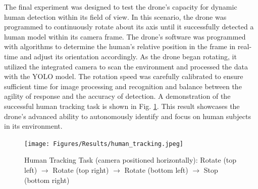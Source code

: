 The final experiment was designed to test the drone's capacity for dynamic human detection within its field of view. In this scenario, the drone was programmed to continuously rotate about its axis until it successfully detected a human model within its camera frame. The drone's software was programmed with algorithms to determine the human's relative position in the frame in real-time and adjust its orientation accordingly. As the drone began rotating, it utilized the integrated camera to scan the environment and processed the data with the YOLO model. The rotation speed was carefully calibrated to ensure sufficient time for image processing and recognition and balance between the agility of response and the accuracy of detection. A demonstration of the successful human tracking task is shown in Fig. \ref{fig3d3}. This result showcases the drone's advanced ability to autonomously identify and focus on human subjects in its environment.

\begin{figure}[H]
    \centerline{\texttt{[image: Figures/Results/human\_tracking.jpeg]}}
    \caption{Human Tracking Task (camera positioned horizontally): Rotate (top left) $\rightarrow$ Rotate (top right) $\rightarrow$ Rotate (bottom left) $\rightarrow$ Stop (bottom right)}
    \label{fig3d3}
\end{figure}
